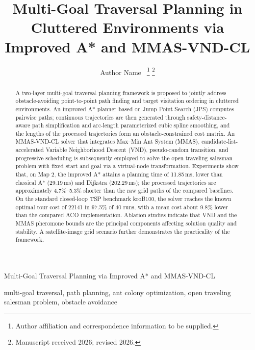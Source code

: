 \documentclass[lettersize,journal]{IEEEtran}
\begin{document}
\title{Multi-Goal Traversal Planning in Cluttered Environments via Improved A* and MMAS-VND-CL}

\author{Author Name~%
\thanks{Author affiliation and correspondence information to be supplied.}%
\thanks{Manuscript received 2026; revised 2026.}}

%
{Multi-Goal Traversal Planning via Improved A* and MMAS-VND-CL}

\maketitle

\begin{abstract}

A two-layer multi-goal traversal planning framework is proposed to jointly address obstacle-avoiding point-to-point path finding and target visitation ordering in cluttered environments. An improved A* planner based on Jump Point Search (JPS) computes pairwise paths; continuous trajectories are then generated through safety-distance-aware path simplification and arc-length parameterized cubic spline smoothing, and the lengths of the processed trajectories form an obstacle-constrained cost matrix. An MMAS-VND-CL solver that integrates Max--Min Ant System (MMAS), candidate-list-accelerated Variable Neighborhood Descent (VND), pseudo-random transition, and progressive scheduling is subsequently employed to solve the open traveling salesman problem with fixed start and goal via a virtual-node transformation. Experiments show that, on Map 2, the improved A* attains a planning time of 11.85\,ms, lower than classical A* (29.19\,ms) and Dijkstra (202.29\,ms); the processed trajectories are approximately 4.7\%--5.3\% shorter than the raw grid paths of the compared baselines. On the standard closed-loop TSP benchmark kroB100, the solver reaches the known optimal tour cost of 22141 in 97.5\% of 40 runs, with a mean cost about 9.8\% lower than the compared ACO implementation. Ablation studies indicate that VND and the MMAS pheromone bounds are the principal components affecting solution quality and stability. A satellite-image grid scenario further demonstrates the practicality of the framework.

\end{abstract}

\begin{IEEEkeywords}

multi-goal traversal, path planning, ant colony optimization, open traveling salesman problem, obstacle avoidance

\end{IEEEkeywords}
\end{document}
